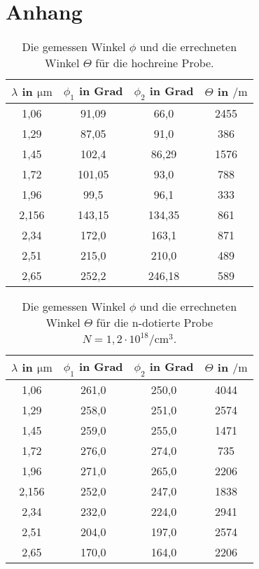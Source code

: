 \section{Anhang}
\label{sec:Anhang}

\begin{table}
    \centering
    \caption{Die gemessen Winkel $\phi$ und die errechneten Winkel $\Theta$ für die hochreine Probe.}
    \label{tab:bla}
    \begin{tabular}{c c c c}
        \toprule
        $\lambda$ in $\si{\um}$ & $\phi_1$ in Grad  & $\phi_2$ in Grad & $\Theta$ in $\si{\per\meter}$ \\
        \midrule
        1,06  &  91,09  &  66,0  &  2455  \\
        1,29  &  87,05  &  91,0  &  386 \\
        1,45  &  102,4  &  86,29  &  1576  \\
        1,72  &  101,05  &  93,0  &  788 \\
        1,96  &  99,5  &  96,1  &  333 \\
        2,156  &  143,15  &  134,35  &  861  \\
        2,34  &  172,0  &  163,1  &  871\\
        2,51  &  215,0  &  210,0  &  489\\
        2,65  &  252,2  &  246,18  &  589 \\
        \bottomrule
    \end{tabular}
\end{table}

\begin{table}
    \centering
    \caption{Die gemessen Winkel $\phi$ und die errechneten Winkel $\Theta$ für die n-dotierte Probe $N = 1,2 \cdot 10^{18} \si{\per\cubic\cm}$.}
    \label{tab:bla}
    \begin{tabular}{c c c c}
        \toprule
        $\lambda$ in $\si{\um}$ & $\phi_1$ in Grad  & $\phi_2$ in Grad & $\Theta$ in $\si{\per\meter}$ \\
        \midrule
        1,06  &  261,0  &  250,0  &  4044 \\
        1,29  &  258,0  &  251,0  &  2574 \\
        1,45  &  259,0  &  255,0  &  1471 \\
        1,72  &  276,0  &  274,0  &  735\\
        1,96  &  271,0  &  265,0  &  2206 \\
        2,156  &  252,0  &  247,0 &  1838 \\
        2,34  &  232,0  &  224,0  &  2941 \\
        2,51  &  204,0  &  197,0  &  2574 \\
        2,65  &  170,0  &  164,0  &  2206 \\
        \bottomrule
    \end{tabular}
\end{table}

